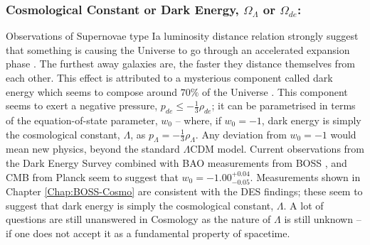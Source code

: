 \subsubsection{Cosmological Constant or Dark Energy, $\Omega_{\Lambda}$ or $\Omega_{de}$:}
Observations of Supernovae type Ia luminosity distance relation strongly suggest that something is causing the Universe to go through an accelerated expansion phase \citep{1998Riess,1999Perlmutter,2018LambdaCentury}. The furthest away galaxies are, the faster they distance themselves from each other. This effect is attributed to a mysterious component called dark energy which seems to compose around $70\%$ of the Universe \citep{2018PlanckCosmology}. This component seems to exert a negative pressure, $p_{de} \leq - \frac{1}{3}\rho_{de}$; it can be parametrised in terms of the equation-of-state parameter, $w_0$ -- where, if $w_0 = -1$, dark energy is simply the cosmological constant, $\Lambda$, as $p_{\Lambda}= -\frac{1}{3}\rho_{\Lambda}$. Any deviation from $w_0 = -1$ would mean new physics, beyond the standard $\Lambda$CDM model. Current observations from the Dark Energy Survey combined with BAO measurements from BOSS \citep{2016BOSSCosmology}, and CMB from Planck \citep{PlanckCosmology2016} seem to suggest that $w_0 = -1.00^{+0.04}_{-0.05}$. Measurements shown in Chapter \ref{Chap:BOSS-Cosmo} are consistent with the DES findings; these seem to suggest that dark energy is simply the cosmological constant, $\Lambda$. A lot of questions are still unanswered in Cosmology as the nature of $\Lambda$ is still unknown -- if one does not accept it as a fundamental property of spacetime.

